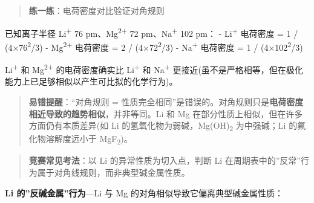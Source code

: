\begin{quote}
\textbf{练一练}：电荷密度对比验证对角规则
\end{quote}

已知离子半径 Li\textsuperscript{+} 76 pm、Mg\textsuperscript{2+} 72 pm、Na\textsuperscript{+} 102 pm：
- Li\textsuperscript{+} 电荷密度 = 1 / (4\派×76\textsuperscript{2}/3) 
- Mg\textsuperscript{2+} 电荷密度 = 2 / (4\派×72\textsuperscript{2}/3) 
- Na\textsuperscript{+} 电荷密度 = 1 / (4\派×102\textsuperscript{2}/3) 

Li\textsuperscript{+} 和 Mg\textsuperscript{2+} 的电荷密度确实比 Li\textsuperscript{+} 和 Na\textsuperscript{+} 更接近(虽不是严格相等，但在极化能力上已足够相似以产生可比拟的化学行为)。

\begin{quote}
\textbf{易错提醒}：``对角规则 = 性质完全相同''是错误的。对角规则只是\textbf{电荷密度相近导致的趋势相似}，并非等同。Li 和 Mg 在部分性质上相似，但在许多方面仍有本质差异(如 Li 的氢氧化物为弱碱，Mg(OH)\textsubscript{2} 为中强碱；Li 的氟化物溶解度远小于 MgF\textsubscript{2})。
\end{quote}

\begin{quote}
\textbf{竞赛常见考法}：以 Li 的异常性质为切入点，判断 Li 在周期表中的''反常''行为属于对角线规则，而非典型碱金属性质。
\end{quote}

\textbf{Li 的''反碱金属''行为}---Li 与 Mg 的对角相似导致它偏离典型碱金属性质：

